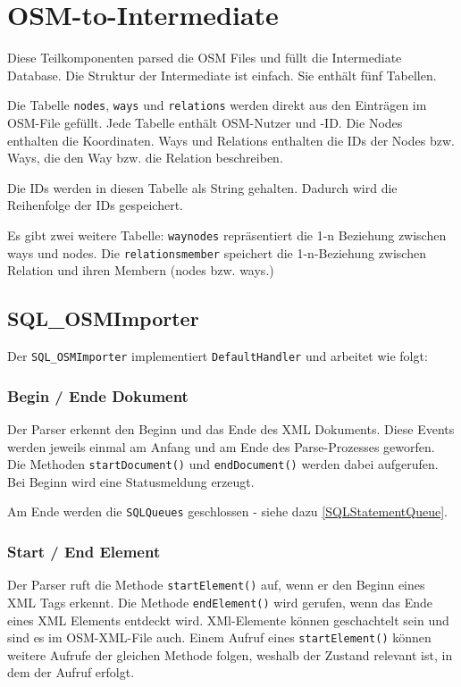 \section{OSM-to-Intermediate}
Diese Teilkomponenten parsed die OSM Files und füllt die Intermediate Database.
Die Struktur der Intermediate ist einfach. Sie enthält fünf Tabellen.

Die Tabelle {\tt nodes}, {\tt ways} und {\tt relations} werden direkt aus
den Einträgen im OSM-File gefüllt. Jede Tabelle enthält OSM-Nutzer und -ID.
Die Nodes enthalten die Koordinaten. Ways und Relations enthalten die IDs
der Nodes bzw. Ways, die den Way bzw. die Relation beschreiben.

Die IDs werden in diesen Tabelle als String gehalten. Dadurch wird die
Reihenfolge der IDs gespeichert.

Es gibt zwei weitere Tabelle: {\tt waynodes} repräsentiert die 1-n Beziehung
zwischen ways und nodes. Die {\tt relationsmember} speichert die 1-n-Beziehung 
zwischen Relation und ihren Membern (nodes bzw. ways.)

\subsection{SQL\_OSMImporter}
Der {\tt SQL\_OSMImporter} implementiert {\tt DefaultHandler} und arbeitet wie folgt:

\subsubsection{Begin / Ende Dokument}
Der Parser erkennt den Beginn und das Ende des XML Dokuments. Diese Events werden jeweils
einmal am Anfang und am Ende des Parse-Prozesses geworfen. Die Methoden {\tt startDocument()}
und {\tt endDocument()} werden dabei aufgerufen. Bei Beginn wird eine Statusmeldung erzeugt.

Am Ende werden die {\tt SQLQueues} geschlossen - siehe dazu \ref{SQLStatementQueue}.

\subsubsection{Start / End Element}
Der Parser ruft die Methode {\tt startElement()} auf, wenn er den Beginn eines XML
Tags erkennt. Die Methode {\tt endElement()} wird gerufen, wenn das Ende eines
XML Elements entdeckt wird. XMl-Elemente können geschachtelt sein und sind es im
OSM-XML-File auch. Einem Aufruf eines {\tt startElement()} können weitere Aufrufe
der gleichen Methode folgen, weshalb der Zustand relevant ist, in dem der Aufruf erfolgt.

